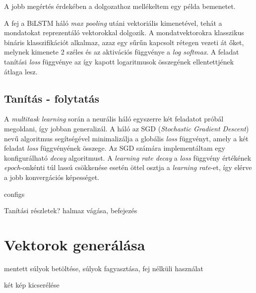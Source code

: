 \begin{note}
	A jobb megértés érdekében a dolgozathoz mellékeltem egy példa bemenetet.
\end{note}

A fej a BiLSTM háló \textit{max pooling} utáni vektoriális kimenetével, tehát a mondatokat reprezentáló vektorokkal dolgozik. A mondatvektorokra klasszikus bináris klasszifikációt alkalmaz, azaz egy sűrűn kapcsolt rétegen vezeti át őket, melynek kimenete 2 széles és az aktivációs függvénye a \textit{log softmax}. A feladat tanítási \textit{loss} függvénye az így kapott logaritmusok összegének ellentettjének átlaga lesz.

\subsection*{Tanítás - folytatás}
A \textit{multitask learning} során a neurális háló egyszerre két feladatot próbál megoldani, így jobban generalizál. A háló az SGD (\textit{Stochastic Gradient Descent}) nevű algoritmus segítségével minimalizálja a globális \textit{loss} függvényt, amely a két feladat \textit{loss} függvényének összege.
Az SGD számára implementáltam egy konfigurálható \textit{decay} algoritmust. A \textit{learning rate decay} a \textit{loss} függvény értékének \textit{epoch}-onkénti túl lassú csökkenése esetén öttel osztja a \textit{learning rate}-et, így elérve a jobb konvergációs képességet.

configs

Tanítási részletek? halmaz vágása, befejezés


\section{Vektorok generálása}



mentett súlyok betöltése, súlyok fagyasztása, fej nélküli használat

két kép kicserélése